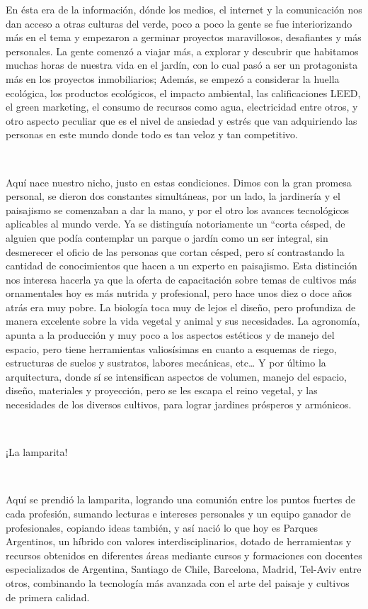 En ésta era de la información, dónde los medios, el internet y la
comunicación nos dan acceso a otras culturas del verde, poco a poco la
gente se fue interiorizando más en el tema y empezaron a germinar
proyectos maravillosos, desafiantes y más personales. La gente comenzó a
viajar más, a explorar y descubrir que habitamos muchas horas de nuestra
vida en el jardín, con lo cual pasó a ser un protagonista más en los
proyectos inmobiliarios; Además, se empezó a considerar la huella
ecológica, los productos ecológicos, el impacto ambiental, las
calificaciones LEED, el green marketing, el consumo de recursos como
agua, electricidad entre otros, y otro aspecto peculiar que es el nivel
de ansiedad y estrés que van adquiriendo las personas en este mundo
donde todo es tan veloz y tan competitivo.

~

Aquí nace nuestro nicho, justo en estas condiciones. Dimos con la gran
promesa personal, se dieron dos constantes simultáneas, por un lado, la
jardinería y el paisajismo se comenzaban a dar la mano, y por el otro
los avances tecnológicos aplicables al mundo verde. Ya se distinguía
notoriamente un ``corta césped, de alguien que podía contemplar un
parque o jardín como un ser integral, sin desmerecer el oficio de las
personas que cortan césped, pero sí contrastando la cantidad de
conocimientos que hacen a un experto en paisajismo. Esta distinción nos
interesa hacerla ya que la oferta de capacitación sobre temas de
cultivos más ornamentales hoy es más nutrida y profesional, pero hace
unos diez o doce años atrás era muy pobre. La biología toca muy de lejos
el diseño, pero profundiza de manera excelente sobre la vida vegetal y
animal y sus necesidades. La agronomía, apunta a la producción y muy
poco a los aspectos estéticos y de manejo del espacio, pero tiene
herramientas valiosísimas en cuanto a esquemas de riego, estructuras de
suelos y sustratos, labores mecánicas, etc\ldots{} Y por último la
arquitectura, donde sí se intensifican aspectos de volumen, manejo del
espacio, diseño, materiales y proyección, pero se les escapa el reino
vegetal, y las necesidades de los diversos cultivos, para lograr
jardines prósperos y armónicos.

~

¡La lamparita!

~

Aquí se prendió la lamparita, logrando una comunión entre los puntos
fuertes de cada profesión, sumando lecturas e intereses personales y un
equipo ganador de profesionales, copiando ideas también, y así nació lo
que hoy es Parques Argentinos, un híbrido con valores
interdisciplinarios, dotado de herramientas y recursos obtenidos en
diferentes áreas mediante cursos y formaciones con docentes
especializados de Argentina, Santiago de Chile, Barcelona, Madrid,
Tel-Aviv entre otros, combinando la tecnología más avanzada con el arte
del paisaje y cultivos de primera calidad.

